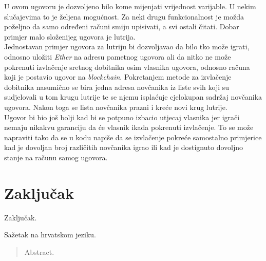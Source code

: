 \documentclass[times, utf8, zavrsni]{fer}
\begin{document}
U ovom ugovoru je dozvoljeno bilo kome mijenjati vrijednost varijable. U nekim slučajevima to je željena mogućnost. Za neki drugu funkcionalnost je možda poželjno da
samo određeni računi smiju upisivati, a svi ostali čitati. Dobar primjer malo složenijeg ugovora je lutrija. \\
Jednostavan primjer ugovora za lutriju bi dozvoljavao da bilo tko može igrati, odnosno uložiti \emph{Ether} na adresu pametnog ugovora ali da nitko ne može pokrenuti
izvlačenje sretnog dobitnika osim vlasnika ugovora, odnosno računa koji je postavio ugovor na \emph{blockchain}. Pokretanjem metode za izvlačenje dobitnika nasumično
se bira jedna adresa novčanika iz liste svih koji su sudjelovali u tom krugu lutrije te se njemu isplaćuje cjelokupan sadržaj novčanika ugovora. Nakon toga se lista
novčanika prazni i kreće novi krug lutrije. \\
Ugovor bi bio još bolji kad bi se potpuno izbacio utjecaj vlasnika jer igrači nemaju nikakvu garanciju da će vlasnik ikada pokrenuti izvlačenje. To se može napraviti
tako da se u kodu napiše da se izvlačenje pokreće samostalno primjerice kad je dovoljan broj različitih novčanika igrao ili kad je dostignuto dovoljno stanje na računu
samog ugovora.

\chapter{Zaključak}
Zaključak.





\begin{sazetak}
Sažetak na hrvatskom jeziku.

\end{sazetak}

\begin{abstract}
Abstract.

\end{abstract}
\end{document}
